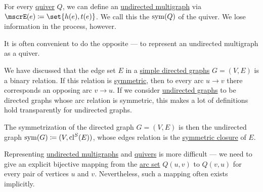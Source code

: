 \begin{remark}\label{rem:undirected_graphs_as_directed}
  For every \hyperref[def:graph/quiver]{quiver} \( Q \), we can define an \hyperref[def:graph/undirected_multigraph]{undirected multigraph} via \( \mscrE(e) \coloneqq \set{ h(e), t(e) } \). We call this the  \( \operatorname{sym}(Q) \) of the quiver. We lose information in the process, however.

  It is often convenient to do the opposite --- to represent an undirected multigraph as a quiver.

  We have discussed that the edge set \( E \) in a \hyperref[def:graph/simple_directed]{simple directed graphs} \( G = (V, E) \) is a binary relation. If this relation is \hyperref[def:binary_relation/symmetric]{symmetric}, then to every arc \( u \to v \) there corresponds an opposing arc \( v \to u \). If we consider \hyperref[def:graph/simple_directed]{undirected graphs} to be directed graphs whose arc relation is symmetric, this makes a lot of definitions hold transparently for undirected graphs.

  The symmetrization of the directed graph \( G = (V, E) \) is then the undirected graph \( \operatorname{sym}(G) \coloneqq (V, \operatorname{cl}^S(E)) \), whose edges relation is the \hyperref[def:relation_closures/symmetric]{symmetric closure} of \( E \).

  Representing \hyperref[def:graph/undirected_multigraph]{undirected multigraphs} and \hyperref[def:graph/quiver]{quivers} is more difficult --- we need to give an explicit bijective mapping from the \hyperref[eq:def:graph/quiver/arc_set]{arc set} \( Q(u, v) \) to \( Q(v, u) \) for every pair of vertices \( u \) and \( v \). Nevertheless, such a mapping often exists implicitly.
\end{remark}

